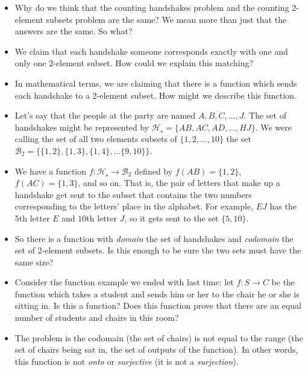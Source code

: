 \documentclass[12pt]{article}
\theoremstyle{plain}
\theoremstyle{definition}
\theoremstyle{remark}
\begin{document}
\begin{itemize}
\item Why do we think that the counting handshakes problem and the counting 2-element subsets problem are the same?  We mean more than just that the answers are the same.  So what?

\item We claim that each handshake someone corresponds exactly with one and only one 2-element subset.  How could we explain this matching?

\item In mathematical terms, we are claiming that there is a function which sends each handshake to a 2-element subset.  How might we describe this function.

\item Let's say that the people at the party are named $A, B, C, \ldots, J$.  The set of handshakes might be represented by $\mathcal{H_s}= \{AB, AC, AD, \ldots, HJ\}$.   We were calling the set of all two elements subsets of $\{1,2,\ldots, 10\}$ the set $\mathcal{B}_2 = \{\{1,2\}, \{1,3\}, \{1,4\}, \ldots\{9,10\}\}$.

\item We have a function $f: \mathcal{H_s} \to \mathcal{B}_2$ defined by $f(AB) = \{1,2\}$, $f(AC) = \{1,3\}$, and so on.  That is, the pair of letters that make up a handshake get sent to the subset that contains the two numbers corresponding to the letters' place in the alphabet.  For example, $EJ$ has the 5th letter $E$ and $10$th letter $J$, so it gets sent to the set $\{5,10\}$.

\item So there is a function with {\em domain} the set of handshakes and {\em codomain} the set of 2-element subsets.  Is this enough to be sure the two sets must have the same size?

\item Consider the function example we ended with last time: let $f:S \to C$ be the function which takes a student and sends him or her to the chair he or she is sitting in.  Is this a function?  Does this function prove that there are an equal number of students and chairs in this room?

\item The problem is the codomain (the set of chairs) is not equal to the range (the set of chairs being sat in, the set of outputs of the function).  In other words, this function is not {\em onto} or {\em surjective} (it is not a {\em surjection}).


\end{itemize}
\end{document}
